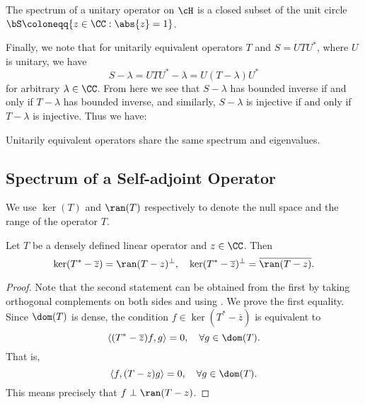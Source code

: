 \documentclass[oneside,reqno,letterpaper]{amsart}
\begin{document}
\begin{corollary}
\label{thm:unitary-spectrum}
  The spectrum of a unitary operator on \(\cH\) is a closed subset of the unit circle \(\bS \coloneqq \{z \in \CC: \abs{z} = 1\}\). 
\end{corollary}


Finally, we note that for unitarily equivalent operators \(T\) and \(S = U T U^*\), where \(U\) is unitary, we have 
\[
  S - \lambda = U T U^* - \lambda = U (T - \lambda) U^* 
\] 
for arbitrary \(\lambda \in \CC\). 
From here we see that \(S - \lambda\) has bounded inverse if and only if \(T - \lambda\) has bounded inverse, and similarly, \(S - \lambda\) is injective if and only if \(T - \lambda\) is injective. 
Thus we have:

\begin{proposition}
  \label{thm:spectrum-of-unitarily-equivalent-operators}
  Unitarily equivalent operators share the same spectrum and eigenvalues.
\end{proposition}



\subsection{Spectrum of a Self-adjoint Operator}
We use \(\ker(T)\) and \(\ran(T)\) respectively to denote the null space and the range of the operator \(T\). 
\begin{proposition}
\label{thm:nullspace-and-range-of-adjoint}
  Let \(T\) be a densely defined linear operator and \(z \in \CC\). Then
  \[
    \ker(T^* - \overline{z}) = \ran(T - z)^\perp, \quad \ker(T^* - \overline{z})^\perp = \overline{\ran(T - z)} . 
  \] 
\end{proposition}
\begin{proof}
  Note that the second statement can be obtained from the first by taking orthogonal complements on both sides and using . 
  We prove the first equality. 
  Since \(\dom(T)\) is dense, the condition \(f \in \ker(T^* - \overline{z})\) is equivalent to 
  \[
    \left< (T^* -  \overline{z})f, g \right> = 0, \quad \forall g \in \dom(T) . 
  \]
  That is, 
  \[
    \left< f, (T - z) g \right> = 0, \quad \forall g \in \dom(T) . 
  \] 
  This means precisely that \(f \perp \ran(T - z)\). 
\end{proof}
\end{document}
